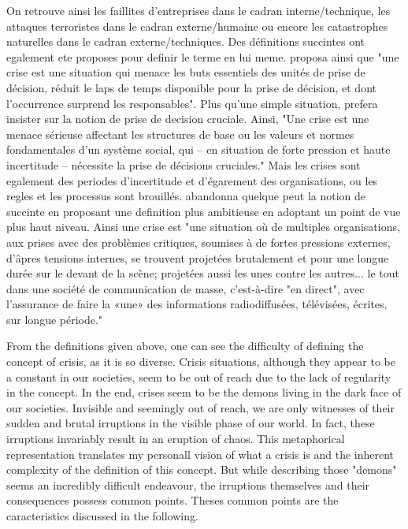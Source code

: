 On retrouve ainsi les faillites d'entreprises dans le cadran interne/technique, les attaques terroristes dans le cadran externe/humaine ou encore les catastrophes
naturelles dans le cadran externe/techniques.
Des définitions succintes ont egalement ete proposes pour definir le terme en lui meme.
\cite{hermannIssuesStudyInternational1972} proposa ainsi que "une crise est une situation qui menace les buts essentiels des unités de prise de décision,
réduit le laps de temps disponible pour la prise de décision, et dont l'occurrence surprend les responsables".
Plus qu'une simple situation, \cite{rosenthalCrisisDecisionMakingNetherlands1986} prefera insister sur la notion de prise de decision cruciale.
Ainsi, "Une crise est une menace sérieuse affectant les structures de base ou les valeurs et normes fondamentales d'un système social,
qui – en situation de forte pression et haute incertitude – nécessite la prise de décisions cruciales."
Mais les crises sont egalement des periodes d'incertitude et d'égarement des organisations, ou les regles et les processus sont brouillés.
\cite{lagadecGESTIONCRISES1994} abandonna quelque peut la notion de succinte en proposant une definition plus ambitieuse en
adoptant un point de vue plus haut niveau. Ainsi une crise est "une situation où de multiples organisations, aux prises avec des problèmes critiques,
soumises à de fortes pressions externes, d'âpres tensions internes, se trouvent projetées brutalement et pour une longue durée sur le devant de la scène;
projetées aussi les unes contre les autres... le tout dans une société de communication de masse, c'est-à-dire "en direct", avec l'assurance de faire
la «une» des informations radiodiffusées, télévisées, écrites, sur longue période."

From the definitions given above, one can see the difficulty of defining the concept of crisis, as it is so diverse.
Crisis situations, although they appear to be a constant in our societies, seem to be out of reach due to the lack of regularity in the concept.
In the end, crises seem to be the demons living in the dark face of our societies.
Invisible and seemingly out of reach, we are only witnesses of their sudden and brutal irruptions in the visible phase of our world.
In fact, these irruptions invariably result in an eruption of chaos.
This metaphorical representation translates my personall vision of what a crisis is and the inherent complexity of the definition of this concept.
But while describing those "demons" seems an incredibly difficult endeavour, the irruptions themselves and their consequences possess common points.
Theses common points are the caracteristics discussed in the following.


